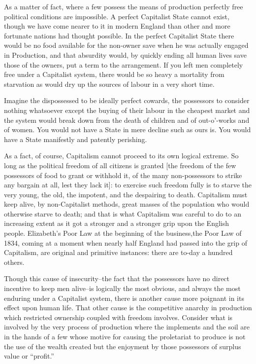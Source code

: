 \documentclass{book}
\begin{document}
As a matter of fact, where a few possess the means of production perfectly free political conditions are impossible. A perfect Capitalist State cannot exist, though we have come nearer to it in modern England than other and more fortunate nations had thought possible. In the perfect Capitalist State there would be no food available for the non-owner save when he was actually engaged in Production, and that absurdity would, by quickly ending all human lives save those of the owners, put a term to the arrangement. If you left men completely free under a Capitalist system, there would be so heavy a mortality from starvation as would dry up the sources of labour in a very short time.

Imagine the dispossessed to be ideally perfect cowards, the possessors to consider nothing whatsoever except the buying of their labour in the cheapest market and the system would break down from the death of children and of out-o’-works and of women. You would not have a State in mere decline such as ours is. You would have a State manifestly and patently perishing.

As a fact, of course, Capitalism cannot proceed to its own logical extreme. So long as the political freedom of all citizens is granted {[}the freedom of the few possessors of food to grant or withhold it, of the many non-possessors to strike any bargain at all, lest they lack it{]}: to exercise such freedom fully is to starve the very young, the old, the impotent, and the despairing to death. Capitalism must keep alive, by non-Capitalist methods, great masses of the population who would otherwise starve to death; and that is what Capitalism was careful to do to an increasing extent as it got a stronger and a stronger grip upon the English people. Elizabeth’s Poor Law at the beginning of the business,the Poor Law of 1834, coming at a moment when nearly half England had passed into the grip of Capitalism, are original and primitive instances: there are to-day a hundred others.

Though this cause of insecurity–the fact that the possessors have no direct incentive to keep men alive–is logically the most obvious, and always the most enduring under a Capitalist system, there is another cause more poignant in its effect upon human life. That other cause is the competitive anarchy in production which restricted ownership coupled with freedom involves. Consider what is involved by the very process of production where the implements and the soil are in the hands of a few whose motive for causing the proletariat to produce is not the use of the wealth created but the enjoyment by those possessors of surplus value or “profit.”
\end{document}
